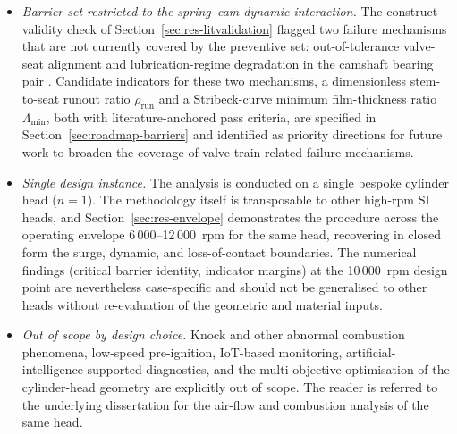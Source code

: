 \begin{itemize}
thermal--structural finite-element analysis of the specific
AP 1.8 cylinder head would refine $L_{\mathrm{Al}}$ and the
localised $\Delta T_{\mathrm{head}}$ field and tighten the
[1.13, 1.60]~mm bracket, but the present deterministic indicator
is no longer a qualitative verification.
\item \emph{Barrier set restricted to the spring--cam dynamic
interaction.} The construct-validity check of
Section~\ref{sec:res-litvalidation} flagged two failure mechanisms
that are not currently covered by the preventive set:
out-of-tolerance valve-seat alignment
\citep{soffritti2018wornvalvetrain} and lubrication-regime
degradation in the camshaft bearing pair
\citep{zhao2023camshaftV6}. Candidate indicators for these two
mechanisms, a dimensionless stem-to-seat runout ratio
$\rho_{\mathrm{run}}$ and a Stribeck-curve minimum film-thickness
ratio $\Lambda_{\min}$, both with literature-anchored pass
criteria, are specified in Section~\ref{sec:roadmap-barriers}
and identified as priority directions for future work to broaden the
coverage of valve-train-related failure mechanisms.
\item \emph{Single design instance.} The analysis is conducted on a
single bespoke cylinder head ($n=1$). The methodology itself is
transposable to other high-rpm SI heads, and
Section~\ref{sec:res-envelope} demonstrates the procedure across the
operating envelope 6\,000--12\,000~rpm for the same head, recovering
in closed form the surge, dynamic, and loss-of-contact boundaries.
The numerical findings (critical barrier identity, indicator
margins) at the 10\,000~rpm design point are nevertheless
case-specific and should not be generalised to other heads
without re-evaluation of the geometric and material inputs.
\item \emph{Out of scope by design choice.} Knock and other abnormal
combustion phenomena, low-speed pre-ignition, IoT-based monitoring,
artificial-intelligence-supported diagnostics, and the multi-objective
optimisation of the cylinder-head geometry are explicitly out of scope.
The reader is referred to the underlying dissertation
\citep{porto2026dissertation} for the air-flow and combustion analysis
of the same head.
\end{itemize}

